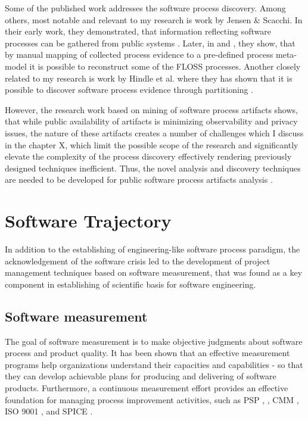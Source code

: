 Some of the published work addresses the software process discovery. Among others, most notable and 
relevant to my research is work by Jensen \& Scacchi. In their early work, they demonstrated, that 
information reflecting software processes can be gathered from public systems \cite{citeulike:12550640}. 
Later, in \cite{citeulike:5043664} and \cite{citeulike:5128808}, they show, that by manual mapping of 
collected process evidence to a pre-defined process meta-model it is possible to reconstruct some 
of the FLOSS processes. 
Another closely related to my research is work by Hindle et al. where they has shown that it is possible to 
discover software process evidence through partitioning \cite{citeulike:10377366}.

However, the research work based on mining of software process artifacts shows, that while public availability 
of artifacts is minimizing observability and privacy issues, the nature of these artifacts creates a number of 
challenges which I discuss in the chapter X, which limit the possible scope of the research and significantly 
elevate the complexity of the process discovery effectively rendering previously designed techniques inefficient.
Thus, the novel analysis and discovery techniques are needed to be developed for public software process artifacts 
analysis \cite{citeulike:7853299}.

%
%
\section{Software Trajectory}\label{sec_software_trajectory}
In addition to the establishing of engineering-like software process paradigm, the acknowledgement of 
the software crisis led to the development of project management techniques based on software measurement, 
that was found as a key component in establishing of scientific basis for software engineering.

\subsection{Software measurement}\label{sec_software_metrics}
The goal of software measurement is to make objective judgments about software process and product quality. 
It has been shown that an effective measurement programs help organizations understand their capacities and 
capabilities - so that they can develop achievable plans for producing and delivering of software products. 
Furthermore, a continuous measurement effort provides an effective foundation for managing process 
improvement activities, such as PSP \cite{citeulike:8347315}, \cite{citeulike:5090131} 
\cite{citeulike:12929216}, CMM \cite{citeulike:9962021}, ISO 9001 \cite{iso-standard}, 
and SPICE \cite{spice-standard}.

